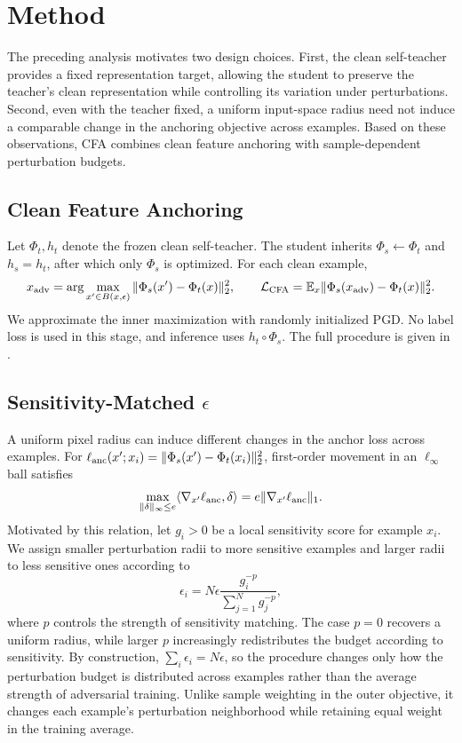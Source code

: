 \documentclass{article} %
\theoremstyle{plain}
\begin{document}
\section{Method}
\label{sec:method}

The preceding analysis motivates two design choices. First, the clean
self-teacher provides a fixed representation target, allowing the student to
preserve the teacher's clean representation while controlling its variation
under perturbations. Second, even with the teacher fixed, a uniform
input-space radius need not induce a comparable change in the anchoring
objective across examples. Based on these observations, CFA combines clean
feature anchoring with sample-dependent perturbation budgets.

\subsection{Clean Feature Anchoring}
\label{sec:anchor}
Let \(\Phi_t,h_t\) denote the frozen clean self-teacher. The student inherits
\(\Phi_s\leftarrow\Phi_t\) and \(h_s=h_t\), after which only \(\Phi_s\) is
optimized. For each clean example,
\begin{equation}
 x_{\rm adv}=\arg\max_{x'\in B(x,\epsilon)}
 \|\Phi_s(x')-\Phi_t(x)\|_2^2,\qquad
 \mathcal L_{\rm CFA}=\mathbb E_x\|\Phi_s(x_{\rm adv})-\Phi_t(x)\|_2^2.
\label{eqn:anchor}
\end{equation}
We approximate the inner maximization with randomly initialized PGD. No label
loss is used in this stage, and inference uses \(h_t\circ\Phi_s\). The full
procedure is given in .

\subsection{Sensitivity-Matched \(\epsilon\)}
\label{sec:angeps}
A uniform pixel radius can induce different changes in the anchor loss across
examples. For
\(\ell_{\rm anc}(x';x_i)=\|\Phi_s(x')-\Phi_t(x_i)\|_2^2\), first-order
movement in an \(\ell_\infty\) ball satisfies
\begin{equation}
\max_{\|\delta\|_\infty\le e}\langle\nabla_{x'}\ell_{\rm anc},\delta\rangle
=e\|\nabla_{x'}\ell_{\rm anc}\|_1.
\label{eqn:firstorder}
\end{equation}
Motivated by this relation, let \(g_i>0\) be a local sensitivity score for
example \(x_i\). We assign smaller perturbation radii to more sensitive
examples and larger radii to less sensitive ones according to
\begin{equation}
\epsilon_i=N\epsilon\frac{g_i^{-p}}{\sum_{j=1}^N g_j^{-p}},
\label{eqn:angeps_ideal}
\end{equation}
where \(p\) controls the strength of sensitivity matching. The case \(p=0\)
recovers a uniform radius, while larger \(p\) increasingly redistributes the
budget according to sensitivity. By construction,
\(\sum_i\epsilon_i=N\epsilon\), so the procedure changes only how the
perturbation budget is distributed across examples rather than the average
strength of adversarial training. Unlike sample weighting in the outer
objective, it changes each example's perturbation neighborhood while retaining
equal weight in the training average.
\end{document}
